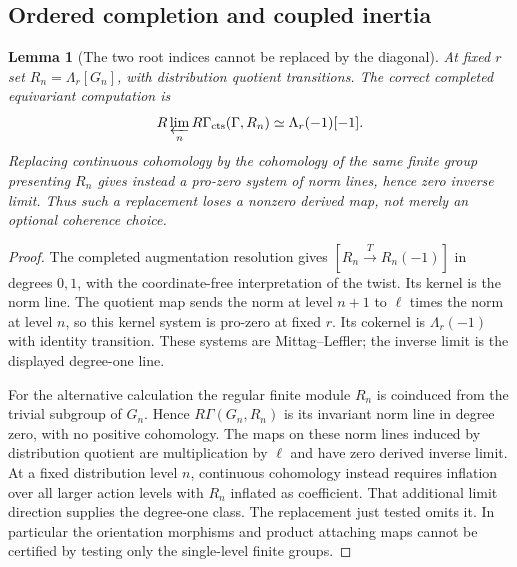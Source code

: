 \documentclass[11pt]{article}
\newtheorem{lemma}[proposition]{Lemma}
\theoremstyle{definition}
\theoremstyle{remark}
\begin{document}
\subsection{Ordered completion and coupled inertia}
\begin{lemma}[The two root indices cannot be replaced by the diagonal]
\label{lem:root-index-obstruction}
At fixed $r$ set $R_n=\Lambda_r[G_n]$, with distribution quotient
transitions.  The correct completed equivariant computation is
\[
 R\varprojlim_n R\Gamma_{\mathrm{cts}}(\Gamma,R_n)
       \simeq\Lambda_r(-1)[-1].
\]
Replacing continuous cohomology by the cohomology of the same
finite group presenting $R_n$ gives instead a pro-zero system of
norm lines, hence zero inverse limit.  Thus such a replacement
loses a nonzero derived map, not merely an optional coherence choice.
\end{lemma}
\begin{proof}
The completed augmentation resolution gives
$[R_n\xrightarrow{T}R_n(-1)]$ in degrees $0,1$, with the
coordinate-free interpretation of the twist.  Its kernel is the
norm line.  The quotient map sends the norm at level $n+1$ to
$\ell$ times the norm at level $n$, so this kernel system is
pro-zero at fixed $r$.  Its cokernel is $\Lambda_r(-1)$ with
identity transition.  These systems are Mittag--Leffler; the
inverse limit is the displayed degree-one line.

For the alternative calculation the regular finite module $R_n$
is coinduced from the trivial subgroup of $G_n$.  Hence
$R\Gamma(G_n,R_n)$ is its invariant norm line in degree zero,
with no positive cohomology.  The maps on these norm lines induced
by distribution quotient are multiplication by $\ell$ and have
zero derived inverse limit.  At a fixed distribution level $n$,
continuous cohomology instead requires inflation over all larger
action levels with $R_n$ inflated as coefficient.  That additional
limit direction supplies the degree-one class.  The replacement
just tested omits it.  In particular the orientation morphisms and
product attaching maps cannot be certified by testing only the
single-level finite groups.
\end{proof}
\end{document}
